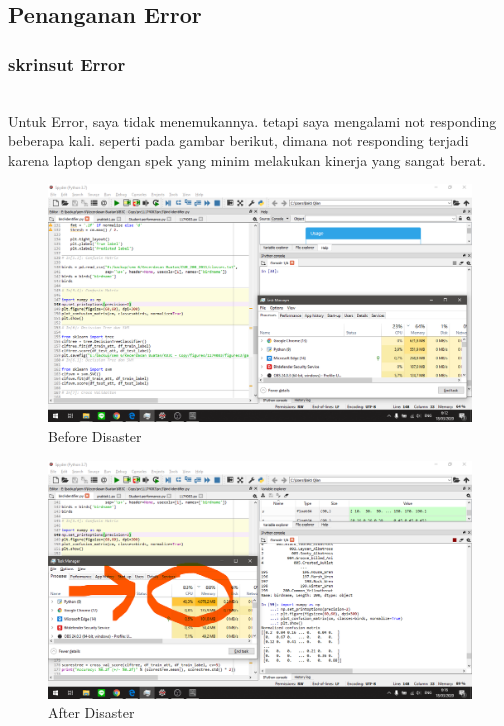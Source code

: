 \subsection{Penanganan Error}
\subsubsection{skrinsut Error}
\hfill\\
Untuk Error, saya tidak menemukannya. tetapi saya mengalami not responding beberapa kali. seperti pada gambar berikut, dimana not responding terjadi karena laptop dengan spek yang minim melakukan kinerja yang sangat berat.
\begin{figure}[H]
	\centering
	\includegraphics[width=12cm]{figures/1174083/figures3/error1.png}
	\caption{Before Disaster}
\end{figure}
\begin{figure}[H]
	\centering
	\includegraphics[width=12cm]{figures/1174083/figures3/error2.png}
	\caption{After Disaster}
\end{figure}

